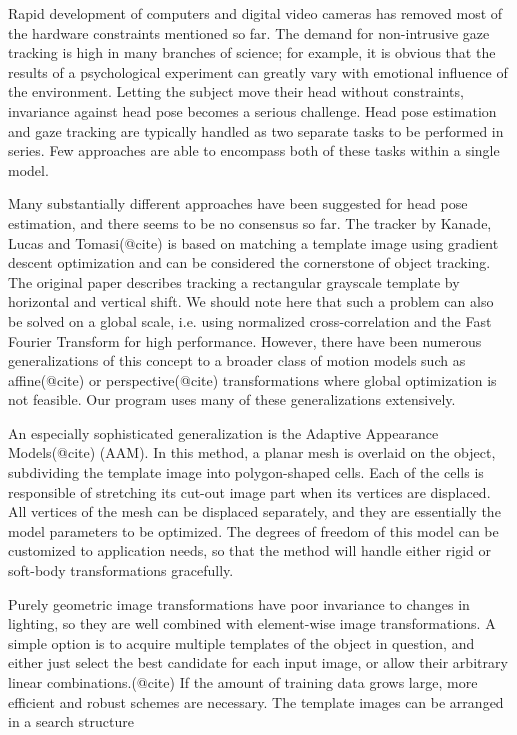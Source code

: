 Rapid development of computers and digital video cameras has removed most of the hardware constraints mentioned so far.
The demand for non-intrusive gaze tracking is high in many branches of science; for example, it is obvious that the results of a psychological experiment can greatly vary with emotional influence of the environment.
Letting the subject move their head without constraints, invariance against head pose becomes a serious challenge.
Head pose estimation and gaze tracking are typically handled as two separate tasks to be performed in series.
Few approaches are able to encompass both of these tasks within a single model.

Many substantially different approaches have been suggested for head pose estimation, and there seems to be no consensus so far.
The tracker by Kanade, Lucas and Tomasi(@cite) is based on matching a template image using gradient descent optimization and can be considered the cornerstone of object tracking.
The original paper describes tracking a rectangular grayscale template by horizontal and vertical shift.
We should note here that such a problem can also be solved on a global scale, i.e. using normalized cross-correlation and the Fast Fourier Transform for high performance.
However, there have been numerous generalizations of this concept to a broader class of motion models such as affine(@cite) or perspective(@cite) transformations where global optimization is not feasible.
Our program uses many of these generalizations extensively.

An especially sophisticated generalization is the Adaptive Appearance Models(@cite) (AAM).
In this method, a planar mesh is overlaid on the object, subdividing the template image into polygon-shaped cells.
Each of the cells is responsible of stretching its cut-out image part when its vertices are displaced.
All vertices of the mesh can be displaced separately, and they are essentially the model parameters to be optimized.
The degrees of freedom of this model can be customized to application needs, so that the method will handle either rigid or soft-body transformations gracefully.

Purely geometric image transformations have poor invariance to changes in lighting, so they are well combined with element-wise image transformations.
A simple option is to acquire multiple templates of the object in question, and either just select the best candidate for each input image, or allow their arbitrary linear combinations.(@cite)
If the amount of training data grows large, more efficient and robust schemes are necessary.
The template images can be arranged in a search structure \todo{\dots}

